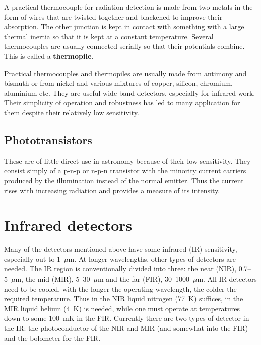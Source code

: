 A practical thermocouple for radiation detection is made from two
metals in the form of wires that are twisted together and blackened to
improve their absorption. The other junction is kept in contact with
something with a large thermal inertia so that it is kept at a
constant temperature. Several thermocouples are usually connected
serially so that their potentials combine. This is called a {\bf
  thermopile}.

Practical thermocouples and thermopiles are usually made from antimony
and bismuth or from nickel and various mixtures of copper, silicon,
chromium, aluminium etc. They are useful wide-band detectors,
especially for infrared work. Their simplicity of operation and
robustness has led to many application for them despite their
relatively low sensitivity.

\subsection{Phototransistors}
These are of little direct use in
astronomy because of their low sensitivity. They consist simply of a
p-n-p or n-p-n transistor with the minority current carriers produced
by the illumination instead of the normal emitter. Thus the current
rises with increasing radiation and provides a measure of its intensity.


\section{Infrared detectors}

Many of the detectors mentioned above have some infrared (IR) sensitivity, 
especially out to 1~$\mu$m. At longer wavelengths, other types of detectors
are needed. The IR region is conventionally divided into three: the near
(NIR), 0.7--5~$\mu$m, the mid (MIR), 5--30~$\mu$m and the far (FIR), 
30--1000~$\mu$m. All IR detectors need to be cooled, with the longer the
operating wavelength, the colder the required temperature. Thus in the 
NIR liquid nitrogen (77~K) suffices, in the MIR liquid helium (4~K) is 
needed, while one must operate at temperatures down to some 100~mK in the 
FIR. Currently there are two types of detector in the IR: the photoconductor
of the NIR and MIR (and somewhat into the FIR) and the bolometer for the
FIR.

